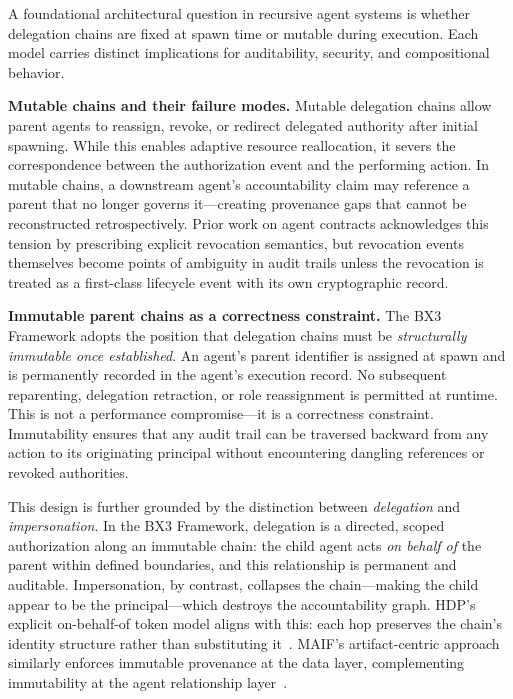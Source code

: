 
A foundational architectural question in recursive agent systems is whether delegation chains are fixed at spawn time or mutable during execution. Each model carries distinct implications for auditability, security, and compositional behavior.

\textbf{Mutable chains and their failure modes.} Mutable delegation chains allow parent agents to reassign, revoke, or redirect delegated authority after initial spawning. While this enables adaptive resource reallocation, it severs the correspondence between the authorization event and the performing action. In mutable chains, a downstream agent's accountability claim may reference a parent that no longer governs it---creating provenance gaps that cannot be reconstructed retrospectively. Prior work on agent contracts acknowledges this tension by prescribing explicit revocation semantics, but revocation events themselves become points of ambiguity in audit trails unless the revocation is treated as a first-class lifecycle event with its own cryptographic record.

\textbf{Immutable parent chains as a correctness constraint.} The BX3 Framework adopts the position that delegation chains must be \textit{structurally immutable once established}. An agent's parent identifier is assigned at spawn and is permanently recorded in the agent's execution record. No subsequent reparenting, delegation retraction, or role reassignment is permitted at runtime. This is not a performance compromise---it is a correctness constraint. Immutability ensures that any audit trail can be traversed backward from any action to its originating principal without encountering dangling references or revoked authorities.

This design is further grounded by the distinction between \textit{delegation} and \textit{impersonation}. In the BX3 Framework, delegation is a directed, scoped authorization along an immutable chain: the child agent acts \textit{on behalf of} the parent within defined boundaries, and this relationship is permanent and auditable. Impersonation, by contrast, collapses the chain---making the child appear to be the principal---which destroys the accountability graph. HDP's explicit on-behalf-of token model aligns with this: each hop preserves the chain's identity structure rather than substituting it~\cite{hdp2026}. MAIF's artifact-centric approach similarly enforces immutable provenance at the data layer, complementing immutability at the agent relationship layer~\cite{maif2025}.

